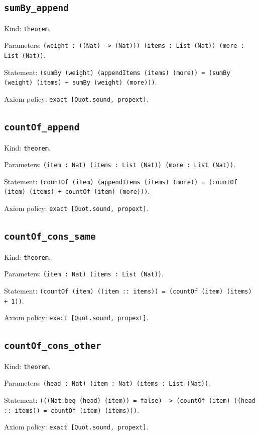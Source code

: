\documentclass[11pt]{article}
\begin{document}
\subsection*{\texttt{sumBy\_append}}
\noindent Kind: \texttt{theorem}.\par
\noindent Parameters: \texttt{(weight : ((Nat) -> (Nat))) (items : List (Nat)) (more : List (Nat))}.\par
\noindent Statement: \texttt{(sumBy (weight) (appendItems (items) (more)) = (sumBy (weight) (items) + sumBy (weight) (more)))}.\par
\noindent Axiom policy: \texttt{exact [Quot.sound, propext]}.\par
\subsection*{\texttt{countOf\_append}}
\noindent Kind: \texttt{theorem}.\par
\noindent Parameters: \texttt{(item : Nat) (items : List (Nat)) (more : List (Nat))}.\par
\noindent Statement: \texttt{(countOf (item) (appendItems (items) (more)) = (countOf (item) (items) + countOf (item) (more)))}.\par
\noindent Axiom policy: \texttt{exact [Quot.sound, propext]}.\par
\subsection*{\texttt{countOf\_cons\_same}}
\noindent Kind: \texttt{theorem}.\par
\noindent Parameters: \texttt{(item : Nat) (items : List (Nat))}.\par
\noindent Statement: \texttt{(countOf (item) ((item :: items)) = (countOf (item) (items) + 1))}.\par
\noindent Axiom policy: \texttt{exact [Quot.sound, propext]}.\par
\subsection*{\texttt{countOf\_cons\_other}}
\noindent Kind: \texttt{theorem}.\par
\noindent Parameters: \texttt{(head : Nat) (item : Nat) (items : List (Nat))}.\par
\noindent Statement: \texttt{(((Nat.beq (head) (item)) = false) -> (countOf (item) ((head :: items)) = countOf (item) (items)))}.\par
\noindent Axiom policy: \texttt{exact [Quot.sound, propext]}.\par
\end{document}
